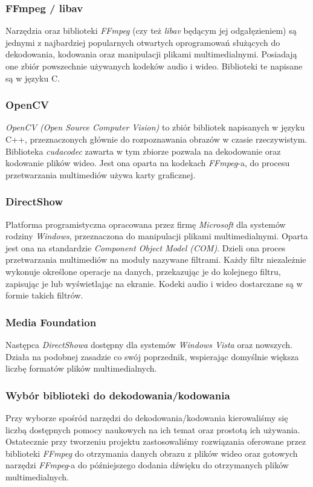 \documentclass[twoside]{projektInzynierskiMS}
\begin{document}
\subsubsection{FFmpeg / libav}
Narzędzia oraz biblioteki \emph{FFmpeg} (czy też \emph{libav} będącym jej odgałęzieniem) są jednymi z najbardziej popularnych otwartych oprogramowań służących do dekodowania, kodowania oraz manipulacji plikami multimedialnymi. Posiadają one zbiór powszechnie używanych kodeków audio i wideo. Biblioteki te napisane są w języku C. 
\subsubsection{OpenCV}
\emph{OpenCV (Open Source Computer Vision)} to zbiór bibliotek napisanych w języku C++, przeznaczonych głównie do rozpoznawania obrazów w czasie rzeczywistym. Biblioteka \emph{cudacodec} zawarta w tym zbiorze pozwala na dekodowanie oraz kodowanie plików wideo. Jest ona oparta na kodekach \emph{FFmpeg}-a, do procesu przetwarzania multimediów używa karty graficznej.
\subsubsection{DirectShow}
Platforma programistyczna opracowana przez firmę \emph{Microsoft} dla systemów rodziny \emph{Windows}, przeznaczona do manipulacji plikami multimedialnymi. Oparta jest ona na standardzie \emph{Component Object Model (COM)}. Dzieli ona proces przetwarzania multimediów na moduły nazywane filtrami. Każdy filtr niezależnie wykonuje określone operacje na danych, przekazując je do kolejnego filtru, zapisując je lub wyświetlając na ekranie. Kodeki audio i wideo dostarczane są w formie takich filtrów.
\subsubsection{Media Foundation}
Następca \emph{DirectShowa} dostępny dla systemów \emph{Windows Vista} oraz nowszych. Działa na podobnej zasadzie co swój poprzednik, wspierając domyślnie większa liczbę formatów plików multimedialnych.
\subsubsection{Wybór biblioteki do dekodowania/kodowania}
Przy wyborze spośród narzędzi do dekodowania/kodowania kierowaliśmy się liczbą dostępnych pomocy naukowych na ich temat oraz prostotą ich używania. Ostatecznie przy tworzeniu projektu zastosowaliśmy rozwiązania oferowane przez biblioteki \emph{FFmpeg} do otrzymania danych obrazu z plików wideo oraz gotowych narzędzi \emph{FFmpeg}-a do późniejszego dodania dźwięku do otrzymanych plików multimedialnych.
\end{document}
